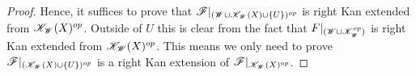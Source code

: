\documentclass[../../thesis.tex]{subfiles}
\begin{document}
\begin{proof}
    Hence, it suffices to prove that $\mathscr{F}|_{(\mathscr{W} \cup \mathscr{K}_{\mathscr{W}}(X)\cup \{U\})^{op}}$ is right Kan extended from $\mathscr{K}_{\mathscr{W}}(X)^{op}$.
    Outside of $U$ this is clear from the fact that $F|_{(\mathscr{W} \cup \mathscr{K}_{\mathscr{W}}^{op})}$ is right Kan extended from $\mathscr{K}_{\mathscr{W}}(X)^{op}$.
    This means we only need to prove $\mathscr{F}|_{(\mathscr{K}_{\mathscr{W}}(X)\cup \{U\})^{op}}$ is a right Kan extension of $\mathscr{F}|_{\mathscr{K}_{\mathscr{W}}(X)^{op}}$.


\end{proof}
\end{document}
